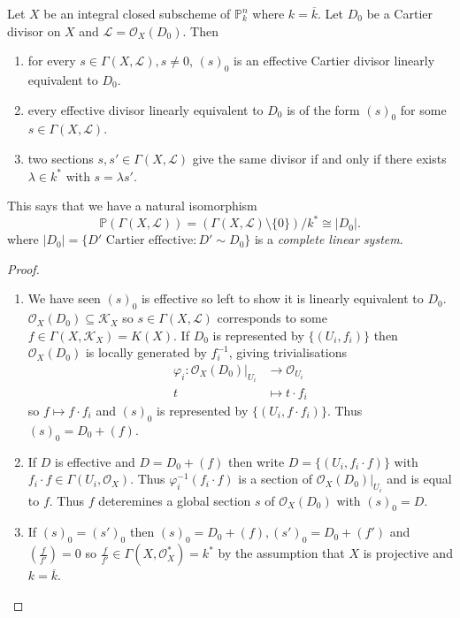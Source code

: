\documentclass[a4paper]{article}
\renewcommand*{\P}{\mathbb{P}}
\newcommand{\sh}[1]{\mathcal{#1}} %
\begin{document}
\begin{theorem}
  Let \(X\) be an integral closed subscheme of \(\P^n_k\) where \(k = \overline k\). Let \(D_0\) be a Cartier divisor on \(X\) and \(\sh L = \sh O_X(D_0)\). Then
  \begin{enumerate}
  \item for every \(s \in \Gamma(X, \sh L), s \neq 0\), \((s)_0\) is an effective Cartier divisor linearly equivalent to \(D_0\).
  \item every effective divisor linearly equivalent to \(D_0\) is of the form \((s)_0\) for some \(s \in \Gamma(X, \sh L)\).
  \item two sections \(s, s' \in \Gamma(X, \sh L)\) give the same divisor if and only if there exists \(\lambda \in k^*\) with \(s = \lambda s'\).
  \end{enumerate}
\end{theorem}

This says that we have a natural isomorphism
\[
  \P(\Gamma(X, \sh L)) = (\Gamma(X, \sh L) \setminus \{0\})/k^* \cong |D_0|.
\]
where \(|D_0| = \{D' \text{ Cartier effective}: D' \sim D_0\}\) is a \emph{complete linear system}.

\begin{proof}\leavevmode
  \begin{enumerate}
  \item We have seen \((s)_0\) is effective so left to show it is linearly equivalent to \(D_0\). \(\sh O_X(D_0) \subseteq \sh K_X\) so \(s \in \Gamma(X, \sh L)\) corresponds to some \(f \in \Gamma(X, \sh K_X) = K(X)\). If \(D_0\) is represented by \(\{(U_i, f_i)\}\) then \(\sh O_X(D_0)\) is locally generated by \(f_i^{-1}\), giving trivialisations
    \begin{align*}
      \varphi_i: \sh O_X(D_0)|_{U_i} &\to \sh O_{U_i} \\
      t &\mapsto t \cdot f_i
    \end{align*}
    so \(f \mapsto f \cdot f_i\) and \((s)_0\) is represented by \(\{(U_i, f \cdot f_i)\}\). Thus \((s)_0 = D_0 + (f)\).
  \item If \(D\) is effective and \(D = D_0 + (f)\) then write \(D = \{(U_i, f_i \cdot f)\}\) with \(f_i \cdot f \in \Gamma(U_i, \sh O_X)\). Thus \(\varphi_i^{-1}(f_i \cdot f)\) is a section of \(\sh O_X(D_0)|_{U_i}\) and is equal to \(f\). Thus \(f\) deteremines a global section \(s\) of \(\sh O_X(D_0)\) with \((s)_0 = D\).
  \item If \((s)_0 = (s')_0\) then \((s)_0 = D_0 + (f), (s')_0 = D_0 + (f')\) and \((\frac{f}{f'}) = 0\) so \(\frac{f}{f'} \in \Gamma(X, \sh O_X^*) = k^*\) by the assumption that \(X\) is projective and \(k = \overline k\).
  \end{enumerate}
\end{proof}
\end{document}
